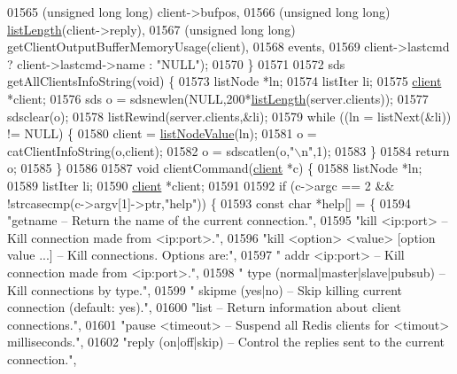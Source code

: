 \begin{DoxyCode}
{{{{{{{{{{{{{{{{{{{01565         (\textcolor{keywordtype}{unsigned} \textcolor{keywordtype}{long} \textcolor{keywordtype}{long}) client->bufpos,
01566         (\textcolor{keywordtype}{unsigned} \textcolor{keywordtype}{long} \textcolor{keywordtype}{long}) \hyperlink{adlist_8h_afde0ab079f934670e82119b43120e94b}{listLength}(client->reply),
01567         (\textcolor{keywordtype}{unsigned} \textcolor{keywordtype}{long} \textcolor{keywordtype}{long}) getClientOutputBufferMemoryUsage(client),
01568         events,
01569         client->lastcmd ? client->lastcmd->name : \textcolor{stringliteral}{"NULL"});
01570 \}
01571 
01572 sds getAllClientsInfoString(\textcolor{keywordtype}{void}) \{
01573     listNode *ln;
01574     listIter li;
01575     \hyperlink{structclient}{client} *client;
01576     sds o = sdsnewlen(NULL,200*\hyperlink{adlist_8h_afde0ab079f934670e82119b43120e94b}{listLength}(server.clients));
01577     sdsclear(o);
01578     listRewind(server.clients,&li);
01579     \textcolor{keywordflow}{while} ((ln = listNext(&li)) != NULL) \{
01580         client = \hyperlink{adlist_8h_af84cae230e7180ebcda1e2736fce9f65}{listNodeValue}(ln);
01581         o = catClientInfoString(o,client);
01582         o = sdscatlen(o,\textcolor{stringliteral}{"\(\backslash\)n"},1);
01583     \}
01584     \textcolor{keywordflow}{return} o;
01585 \}
01586 
01587 \textcolor{keywordtype}{void} clientCommand(\hyperlink{structclient}{client} *c) \{
01588     listNode *ln;
01589     listIter li;
01590     \hyperlink{structclient}{client} *client;
01591 
01592     \textcolor{keywordflow}{if} (c->argc == 2 && !strcasecmp(c->argv[1]->ptr,\textcolor{stringliteral}{"help"})) \{
01593         \textcolor{keyword}{const} \textcolor{keywordtype}{char} *help[] = \{
01594 \textcolor{stringliteral}{"getname -- Return the name of the current connection."},
01595 \textcolor{stringliteral}{"kill <ip:port> -- Kill connection made from <ip:port>."},
01596 \textcolor{stringliteral}{"kill <option> <value> [option value ...] -- Kill connections. Options are:"},
01597 \textcolor{stringliteral}{"     addr <ip:port> -- Kill connection made from <ip:port>."},
01598 \textcolor{stringliteral}{"     type (normal|master|slave|pubsub) -- Kill connections by type."},
01599 \textcolor{stringliteral}{"     skipme (yes|no) -- Skip killing current connection (default: yes)."},
01600 \textcolor{stringliteral}{"list -- Return information about client connections."},
01601 \textcolor{stringliteral}{"pause <timeout> -- Suspend all Redis clients for <timout> milliseconds."},
01602 \textcolor{stringliteral}{"reply (on|off|skip) -- Control the replies sent to the current connection."},
}}}}}}}}}}}}}}}}}}}
\end{DoxyCode}

